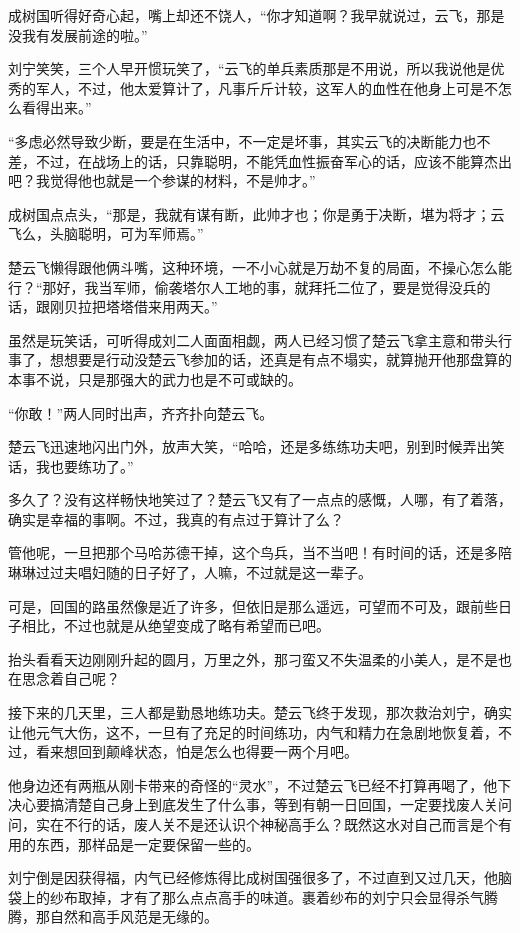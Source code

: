 成树国听得好奇心起，嘴上却还不饶人，“你才知道啊？我早就说过，云飞，那是没我有发展前途的啦。”

刘宁笑笑，三个人早开惯玩笑了，“云飞的单兵素质那是不用说，所以我说他是优秀的军人，不过，他太爱算计了，凡事斤斤计较，这军人的血性在他身上可是不怎么看得出来。”

“多虑必然导致少断，要是在生活中，不一定是坏事，其实云飞的决断能力也不差，不过，在战场上的话，只靠聪明，不能凭血性振奋军心的话，应该不能算杰出吧？我觉得他也就是一个参谋的材料，不是帅才。”

成树国点点头，“那是，我就有谋有断，此帅才也；你是勇于决断，堪为将才；云飞么，头脑聪明，可为军师焉。”

楚云飞懒得跟他俩斗嘴，这种环境，一不小心就是万劫不复的局面，不操心怎么能行？“那好，我当军师，偷袭塔尔人工地的事，就拜托二位了，要是觉得没兵的话，跟刚贝拉把塔塔借来用两天。”

虽然是玩笑话，可听得成刘二人面面相觑，两人已经习惯了楚云飞拿主意和带头行事了，想想要是行动没楚云飞参加的话，还真是有点不塌实，就算抛开他那盘算的本事不说，只是那强大的武力也是不可或缺的。

“你敢！”两人同时出声，齐齐扑向楚云飞。

楚云飞迅速地闪出门外，放声大笑，“哈哈，还是多练练功夫吧，别到时候弄出笑话，我也要练功了。”

多久了？没有这样畅快地笑过了？楚云飞又有了一点点的感慨，人哪，有了着落，确实是幸福的事啊。不过，我真的有点过于算计了么？

管他呢，一旦把那个马哈苏德干掉，这个鸟兵，当不当吧！有时间的话，还是多陪琳琳过过夫唱妇随的日子好了，人嘛，不过就是这一辈子。

可是，回国的路虽然像是近了许多，但依旧是那么遥远，可望而不可及，跟前些日子相比，不过也就是从绝望变成了略有希望而已吧。

抬头看看天边刚刚升起的圆月，万里之外，那刁蛮又不失温柔的小美人，是不是也在思念着自己呢？

接下来的几天里，三人都是勤恳地练功夫。楚云飞终于发现，那次救治刘宁，确实让他元气大伤，这不，一旦有了充足的时间练功，内气和精力在急剧地恢复着，不过，看来想回到颠峰状态，怕是怎么也得要一两个月吧。

他身边还有两瓶从刚卡带来的奇怪的“灵水”，不过楚云飞已经不打算再喝了，他下决心要搞清楚自己身上到底发生了什么事，等到有朝一日回国，一定要找废人关问问，实在不行的话，废人关不是还认识个神秘高手么？既然这水对自己而言是个有用的东西，那样品是一定要保留一些的。

刘宁倒是因获得福，内气已经修炼得比成树国强很多了，不过直到又过几天，他脑袋上的纱布取掉，才有了那么点点高手的味道。裹着纱布的刘宁只会显得杀气腾腾，那自然和高手风范是无缘的。

